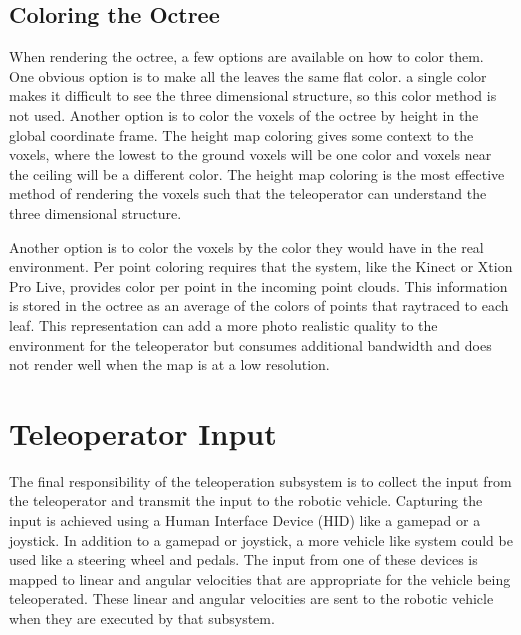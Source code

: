 \documentclass[12pt]{report}
\begin{document}
\subsection{Coloring the Octree}
When rendering the octree, a few options are available on how to color them.  One obvious option is to make all the leaves the same flat color.  a single color makes it difficult to see the three dimensional structure, so this color method is not used.  Another option is to color the voxels of the octree by height in the global coordinate frame.  The height map coloring gives some context to the voxels, where the lowest to the ground voxels will be one color and voxels near the ceiling will be a different color.  The height map coloring is the most effective method of rendering the voxels such that the teleoperator can understand the three dimensional structure.

Another option is to color the voxels by the color they would have in the real environment.  Per point coloring requires that the system, like the Kinect or Xtion Pro Live, provides color per point in the incoming point clouds.  This information is stored in the octree as an average of the colors of points that raytraced to each leaf.  This representation can add a more photo realistic quality to the environment for the teleoperator but consumes additional bandwidth and does not render well when the map is at a low resolution.

\section{Teleoperator Input}
The final responsibility of the teleoperation subsystem is to collect the input from the teleoperator and transmit the input to the robotic vehicle.  Capturing the input is achieved using a Human Interface Device (HID) like a gamepad or a joystick.  In addition to a gamepad or joystick, a more vehicle like system could be used like a steering wheel and pedals.  The input from one of these devices is mapped to linear and angular velocities that are appropriate for the vehicle being teleoperated.  These linear and angular velocities are sent to the robotic vehicle when they are executed by that subsystem.

\end{document}
